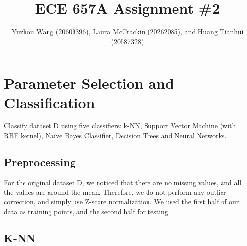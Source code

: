 \documentclass[]{article}
\title{ECE 657A Assignment \#2}
\author{Yuzhou Wang (20609396), Laura McCrackin (20262085), \newline and Huang Tianhui (20587328)       }
\begin{document}
\maketitle



\section{Parameter Selection and Classification}
Classify dataset D using five classifiers: k-NN, Support Vector Machine (with RBF kernel), Naïve Bayes Classifier, Decision Trees and Neural Networks. 
\subsection{Preprocessing}

For the original dataset D, we noticed that there are no missing values, and all the values are around the mean.  Therefore, we do not perform any outlier correction, and simply use Z-score normalization.  We used the first half of our data as training points, and the second half for testing.



\subsection{K-NN}
\end{document}
